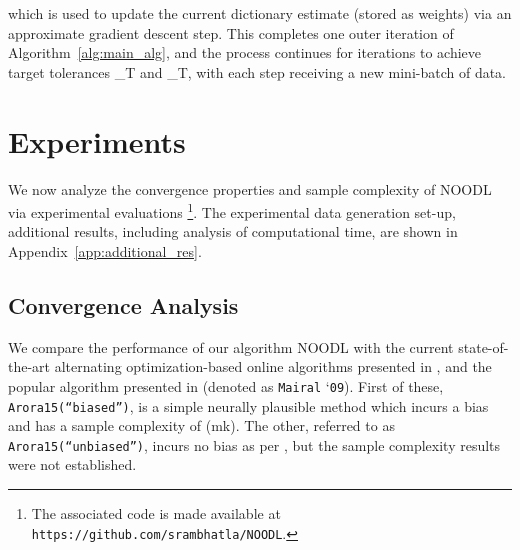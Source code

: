 \documentclass{article}
\def\[#1\]{{$#1$}}
\begin{document}
which is used to update the current dictionary estimate (stored as weights) via an approximate gradient descent step. This completes one outer iteration of Algorithm~\ref{alg:main_alg}, and the process continues for \[T\] iterations to achieve target tolerances \[\epsilon_T\] and \[\delta_T\], with each step receiving a new mini-batch of data. 













\vspace{-4pt}
\section{Experiments}\label{sec:exp} 
\vspace*{-4pt}

We now analyze the convergence properties and sample complexity of NOODL via experimental evaluations \footnote{ The associated code is made available at \texttt{https://github.com/srambhatla/NOODL}.}. The experimental data generation set-up, additional results, including analysis of computational time, are shown in Appendix~\ref{app:additional_res}.



\vspace*{-5pt}
\subsection{Convergence Analysis} 
\vspace*{-5pt}

We compare the performance of our algorithm NOODL with the current state-of-the-art alternating optimization-based online algorithms presented in \cite{Arora15}, and the popular algorithm presented in \cite{Mairal09} (denoted as {\texttt{Mairal} `\texttt{09}}). First of these, \texttt{Arora15(``biased'')}, is a simple neurally plausible method which incurs a bias and has a sample complexity of \[\Omega(mk)\]. The other, referred to as \texttt{Arora15(``unbiased'')}, incurs no bias as per \cite{Arora15}, but the sample complexity results were not established.
\end{document}
